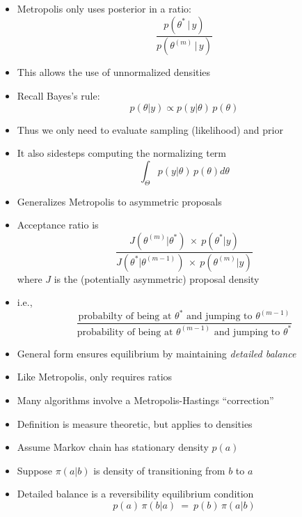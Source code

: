 \documentclass[10pt]{report}
\begin{document}
%
\begin{itemize}
\item Metropolis only uses posterior in a ratio:
\[
\frac{p(\theta^{*} \, | \, y)}
     {p(\theta^{(m)} \, | \, y)}
\]
\item This allows the use of unnormalized densities
\item Recall Bayes's rule:
\[
p(\theta | y) \propto p(y|\theta) \, p(\theta)
\]
\item Thus we only need to evaluate sampling (likelihood) and prior
\item It also sidesteps computing the normalizing term
\[
\int_{\Theta} p(y|\theta) \, p(\theta) d\theta
\]
\end{itemize}


%
\begin{itemize}
\item Generalizes Metropolis to asymmetric proposals
\item Acceptance ratio is
\[
\frac{J(\theta^{(m)}|\theta^{*}) \ \times \ p(\theta^{*}|y)}
     {J(\theta^{*}|\theta^{(m-1)}) \ \times \ p(\theta^{(m)}|y)}
\]
where $J$ is the (potentially asymmetric) proposal density
\item i.e.,
{\small
\[
\frac{\mbox{probabilty of being at } \theta^*
      \mbox{ and jumping to } \theta^{(m-1)}}
     {\mbox{probability of being at } \theta^{(m-1)}
      \mbox{ and jumping to } \theta^{*}}
\]
}
\vspace*{3pt}
\item General form ensures equilibrium
  by maintaining \emph{detailed balance}
\item Like Metropolis, only requires ratios
\item Many algorithms involve a Metropolis-Hastings ``correction''
\end{itemize}


%
\begin{itemize}
\item Definition is measure theoretic, but applies to densities
\item Assume Markov chain has stationary density $p(a)$
\item Suppose $\pi(a | b)$ is density of
  transitioning from $b$ to $a$
\item Detailed balance is a reversibility equilibrium condition
\[
p(a) \,\pi(b | a)
\ = \
p(b) \, \pi(a | b)
\]
\end{itemize}
\end{document}
